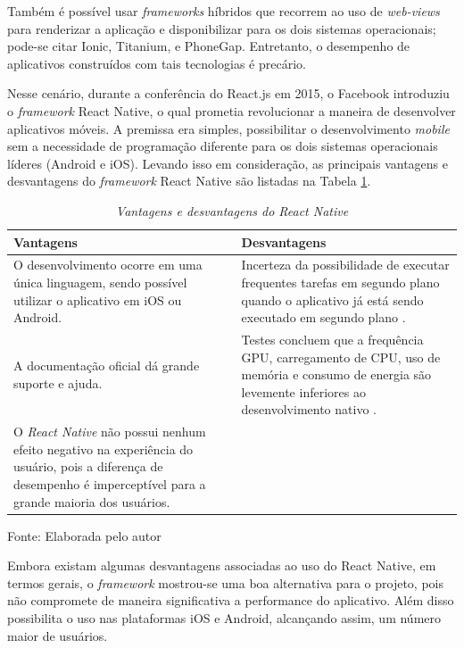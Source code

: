 Também é possível usar \textit{frameworks} híbridos que recorrem ao uso de \textit{web-views} para renderizar a aplicação e disponibilizar para os dois sistemas operacionais; pode-se citar Ionic, Titanium, e PhoneGap. Entretanto, o desempenho de aplicativos construídos com tais tecnologias é precário. 

Nesse cenário, durante a conferência do React.js em 2015, o Facebook introduziu o \textit{framework} React Native, o qual prometia revolucionar a maneira de desenvolver aplicativos móveis. A premissa era simples, possibilitar o desenvolvimento \textit{mobile} sem a necessidade de programação diferente para os dois sistemas operacionais líderes (Android e iOS). Levando isso em consideração, as principais vantagens e desvantagens do \textit{framework} React Native são listadas na Tabela \ref{tab:vanDesvRN}.

\begin{table}[!ht]
\centering
\caption{\textit{Vantagens e desvantagens do React Native}}
\centering
\footnotesize
\begin{tabular}{p{7cm} p{7cm}}
\toprule
\textbf{Vantagens} \citep{danielsson2016} & \textbf{Desvantagens}                          
\\ \midrule
O desenvolvimento ocorre em uma única linguagem, sendo possível utilizar o aplicativo em iOS ou Android.
& 
Incerteza da possibilidade de executar frequentes tarefas em segundo plano quando o aplicativo já está sendo executado em segundo plano \citep{sodebergJohansson}.
\\ \midrule

A documentação oficial dá grande suporte e ajuda.
& 
Testes concluem que a frequência GPU, carregamento de CPU, uso de memória e consumo de energia são levemente inferiores ao desenvolvimento nativo \citep{danielsson2016}.
\\ \midrule

O \textit{React Native} não possui nenhum efeito negativo na experiência do usuário, pois a diferença de desempenho é imperceptível para a grande maioria dos usuários.
& 

\\ \midrule

\end{tabular}
\label{tab:vanDesvRN}

Fonte: Elaborada pelo autor
\end{table}

Embora existam algumas desvantagens associadas ao uso do React Native, em termos gerais, o \textit{framework} mostrou-se uma boa alternativa para o projeto, pois não compromete de maneira significativa a performance do aplicativo. Além disso possibilita o uso nas plataformas iOS e Android, alcançando assim, um número maior de usuários.

